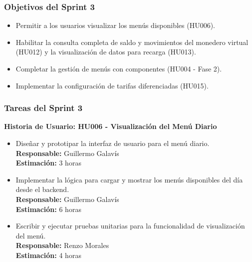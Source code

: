 \documentclass[12pt]{article}
\begin{document}
\subsubsection{Objetivos del Sprint 3}
\begin{itemize}
	\item Permitir a los usuarios visualizar los menús disponibles (HU006).
	\item Habilitar la consulta completa de saldo y movimientos del monedero virtual (HU012) y la visualización de datos para recarga (HU013).
	\item Completar la gestión de menús con componentes (HU004 - Fase 2).
	\item Implementar la configuración de tarifas diferenciadas (HU015).
\end{itemize}

\subsubsection{Tareas del Sprint 3}
\textbf{Historia de Usuario: HU006 - Visualización del Menú Diario}
\begin{itemize}
	\item Diseñar y prototipar la interfaz de usuario para el menú diario. \\
	\textbf{Responsable:} Guillermo Galavís \\
	\textbf{Estimación:} 3 horas
	\item Implementar la lógica para cargar y mostrar los menús disponibles del día desde el backend. \\
	\textbf{Responsable:} Guillermo Galavís \\
	\textbf{Estimación:} 6 horas
	\item Escribir y ejecutar pruebas unitarias para la funcionalidad de visualización del menú. \\
	\textbf{Responsable:} Renzo Morales \\
	\textbf{Estimación:} 4 horas
\end{itemize}
\end{document}

